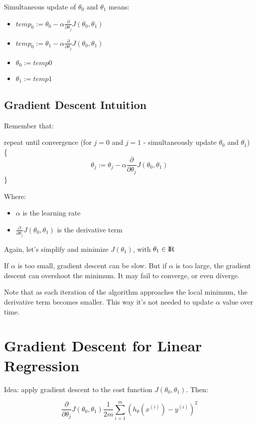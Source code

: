 \documentclass[a4paper]{article}
\begin{document}
Simultaneous update of $\theta_0$ and $\theta_1$ means:

\begin{itemize}
\item $temp_0 := \theta_0 - \alpha \frac{\partial}{\partial \theta_j}J(\theta_0, \theta_1)$
\item $temp_0 := \theta_1 - \alpha \frac{\partial}{\partial \theta_j}J(\theta_0, \theta_1)$
\item $\theta_0 := temp0$
\item $\theta_1 := temp1$
\end{itemize}

\subsection{Gradient Descent Intuition}

Remember that:

\medskip

repeat until convergence (for $j=0$ and $j=1$ - simultaneously update $\theta_0$ and $\theta_1$) \{
$$
\theta_j := \theta_j - \alpha \frac{\partial}{\partial \theta_j}J(\theta_0, \theta_1)
$$
\}

Where:

\begin{itemize}
\item $\alpha$ is the learning rate
\item $\frac{\partial}{\partial \theta_j}J(\theta_0,\theta_1)$ is the derivative term
\end{itemize}

Again, let's simplify and minimize $J(\theta_1)$, with $\theta_1 \in \rm I\!R$

If $\alpha$ is too small, gradient descent can be slow.  But if $\alpha$ is too large, the gradient descent can overshoot the minimum. It may fail to converge, or even diverge.

Note that as each iteration of the algorithm approaches  the local minimum, the derivative term becomes smaller. This way it's not needed to update $\alpha$ value over time.

\section{Gradient Descent for Linear Regression}

Idea: apply gradient descent to the cost function $J(\theta_0, \theta_1)$. Then:

$$
\frac{\partial}{\partial \theta_j}J(\theta_0,\theta_1) \frac{1}{2m}\sum_{i=1}^{m}(h_\theta(x^{(i)}) - y^{(i)})^2
$$
\end{document}
